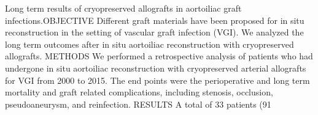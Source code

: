 \documentclass{qqtarticle}
\begin{document}
            Long term results of cryopreserved allografts in aortoiliac graft infections.OBJECTIVE  Different graft materials have been proposed for in situ reconstruction in the setting of vascular graft infection (VGI). We analyzed the long term outcomes after in situ aortoiliac reconstruction with cryopreserved allografts. METHODS  We performed a retrospective analysis of patients who had undergone in situ aortoiliac reconstruction with cryopreserved arterial allografts for VGI from 2000 to 2015. The end points were the perioperative and long term mortality and graft related complications, including stenosis, occlusion, pseudoaneurysm, and reinfection. RESULTS  A total of 33 patients (91%
\end{document}
